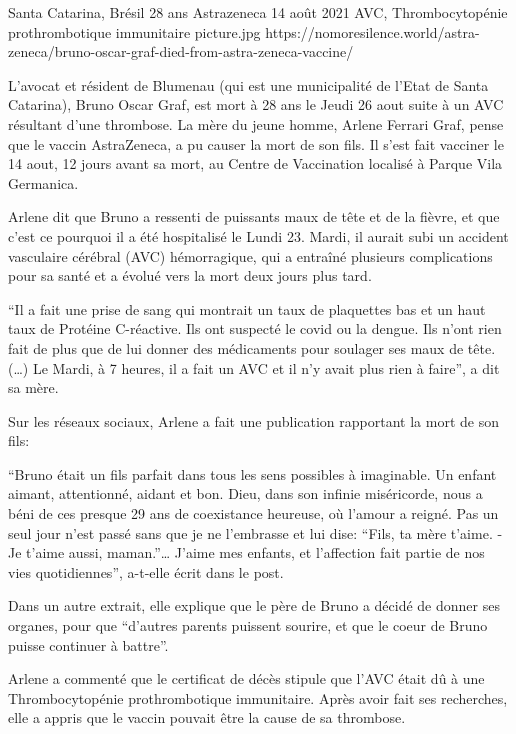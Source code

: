          {Santa Catarina, Brésil}
          {28 ans}
          {Astrazeneca}
          {14 août 2021}
          {AVC,  Thrombocytopénie prothrombotique immunitaire}
          {picture.jpg}
          {https://nomoresilence.world/astra-zeneca/bruno-oscar-graf-died-from-astra-zeneca-vaccine/}
          {

L'avocat et résident de Blumenau (qui est une municipalité de l'Etat de Santa
Catarina), Bruno Oscar Graf, est mort à 28 ans le Jeudi 26 aout suite à un AVC
résultant d'une thrombose. La mère du jeune homme, Arlene Ferrari Graf, pense
que le vaccin AstraZeneca, a pu causer la mort de son fils. Il s'est fait
vacciner le 14 aout, 12 jours avant sa mort, au Centre de Vaccination localisé à
Parque Vila Germanica.

Arlene dit que Bruno a ressenti de puissants maux de tête et de la fièvre, et
que c'est ce pourquoi il a été hospitalisé le Lundi 23. Mardi, il aurait subi un
accident vasculaire cérébral (AVC) hémorragique, qui a entraîné plusieurs
complications pour sa santé et a évolué vers la mort deux jours plus tard.

“Il a fait une prise de sang qui montrait un taux de plaquettes bas et un haut
taux de Protéine C-réactive. Ils ont suspecté le covid ou la dengue. Ils n'ont
rien fait de plus que de lui donner des médicaments pour soulager ses maux de
tête. (…) Le Mardi, à 7 heures, il a fait un AVC et il n'y avait plus rien à
faire”, a dit sa mère.

Sur les réseaux sociaux, Arlene a fait une publication rapportant la mort de son
fils:

“Bruno était un fils parfait dans tous les sens possibles à imaginable. Un
enfant aimant, attentionné, aidant et bon. Dieu, dans son infinie miséricorde,
nous a béni de ces presque 29 ans de coexistance heureuse, où l'amour a
reigné. Pas un seul jour n'est passé sans que je ne l'embrasse et lui dise:
“Fils, ta mère t'aime. - Je t'aime aussi, maman.”… J'aime mes enfants, et
l'affection fait partie de nos vies quotidiennes”, a-t-elle écrit dans le post.

Dans un autre extrait, elle explique que le père de Bruno a décidé de donner ses
organes, pour que “d'autres parents puissent sourire, et que le coeur de Bruno
puisse continuer à battre”.

Arlene a commenté que le certificat de décès stipule que l'AVC était dû à une
Thrombocytopénie prothrombotique immunitaire. Après avoir fait ses recherches,
elle a appris que le vaccin pouvait être la cause de sa thrombose.

}
